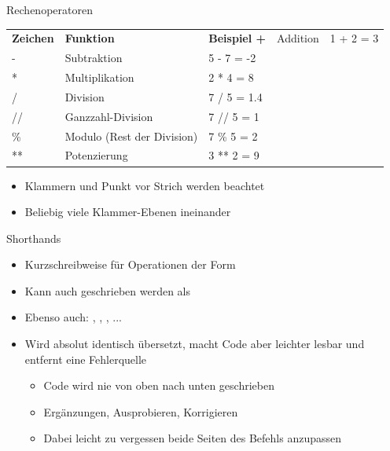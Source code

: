 \begin{frame}{Rechenoperatoren}
%
%
%
\begin{tabularx}
	{\linewidth}
	{OFX}
	\toprule[1.5pt]

	\normalfont	\bfseries Zeichen &
				\bfseries Funktion &
				\bfseries Beispiel
	\tabcrlf
	+  & Addition					& 1 + 2 = 3 \\
	-  & Subtraktion					& 5 - 7 = -2 \\
	*  & Multiplikation				& 2 * 4 = 8 \\
	/  & Division					& 7 / 5 = 1.4 \\
	// & Ganzzahl-Division			& 7 // 5 = 1 \\
	\% & Modulo (Rest der Division)	& 7 \% 5 = 2 \\
	** & Potenzierung				& 3 ** 2 = 9 \\
	
	\bottomrule[1.5pt]	
\end{tabularx}
\begin{itemize}
\item Klammern und Punkt vor Strich werden beachtet
\item Beliebig viele Klammer-Ebenen ineinander
\end{itemize}
%
\end{frame}


\begin{frame}{Shorthands}
%
\begin{itemize}
\item Kurzschreibweise für Operationen der Form 
\item Kann auch geschrieben werden als 
\item Ebenso auch: \inPy{-=}, \inPy{*=}, \inPy{/=}, ...
\item Wird absolut identisch übersetzt, macht Code aber leichter lesbar und entfernt eine Fehlerquelle
	\begin{itemize}
	\item Code wird nie von oben nach unten geschrieben
	\item Ergänzungen, Ausprobieren, Korrigieren
	\item Dabei leicht zu vergessen beide Seiten des Befehls anzupassen
	\end{itemize}
\end{itemize}
%
\end{frame}

